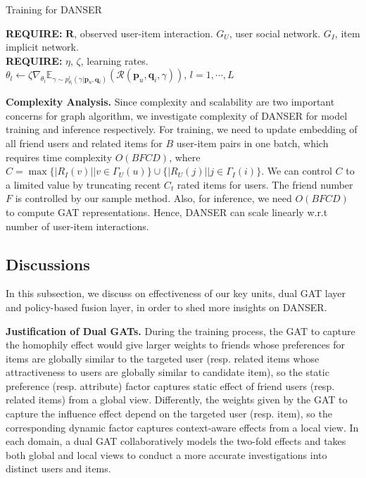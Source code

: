 \documentclass[sigconf]{acmart}
\begin{document}
\begin{algorithm}[h]
	\caption{Training for DANSER}
	\label{alg}
	\textbf{REQUIRE:} $\mathbf R$, observed user-item interaction. $G_U$, user social network. $G_I$, item implicit network.\\
	\textbf{REQUIRE:} $\eta$, $\zeta$, learning rates.\\
	{
	$\theta_l \leftarrow \zeta \nabla_{\theta_l} \mathbb E_{\gamma\sim p^l_{\theta_l}(\gamma|\mathbf p_u, \mathbf q_i)}(\mathcal R(\mathbf p_u, \mathbf q_i, \gamma))$, $l=1,\cdots,L$\;}
\end{algorithm}

\textbf{Complexity Analysis.} Since complexity and scalability are two important concerns for graph algorithm, we investigate complexity of DANSER for model training and inference respectively. For training, we need to update embedding of all friend users and related items for $B$ user-item pairs in one batch, which requires time complexity $O(BFCD)$, where $C=\max\{|R_I(v)||v\in \Gamma_U(u)\}\cup\{|R_U(j)||j\in \Gamma_I(i)\}$. We can control $C$ to a limited value by truncating recent $C_t$ rated items for users. The friend number $F$ is controlled by our sample method. Also, for inference, we need $O(BFCD)$ to compute GAT representations. Hence, DANSER can scale linearly w.r.t number of user-item interactions.

\subsection{Discussions}

In this subsection, we discuss on effectiveness of our key units, dual GAT layer and policy-based fusion layer, in order to shed more insights on DANSER.

\textbf{Justification of Dual GATs.}
{During the} training process, the GAT to capture {the} homophily effect would give larger weights to friends whose preferences for items are globally similar to {the} targeted user (resp. related items whose attractiveness to users are globally similar to candidate item), so the static preference (resp. attribute) factor captures static effect of friend users (resp. related items) from a global view. Differently, the weights given by the GAT to capture {the} influence effect depend on {the} targeted user (resp. item), so the corresponding dynamic factor captures context-aware effect{s} from a local view. In each domain, a dual GAT collaboratively models {the} two-fold effects and takes both global and local views to conduct a more accurate investigations into distinct users and items.
\end{document}
